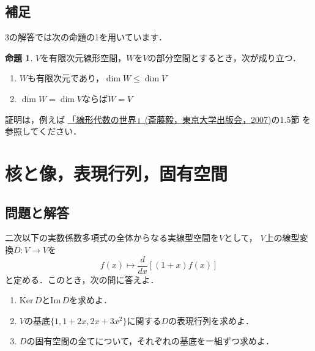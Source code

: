 \documentclass{jsarticle}
\theoremstyle{definition}
\newtheorem{prop}[defi]{命題}
\begin{document}
\subsection{補足}

3の解答では次の命題の1を用いています．

\begin{prop}\label{dim}
$V$を有限次元線形空間，$W$を$V$の部分空間とするとき，次が成り立つ．
\begin{enumerate}
\item $W$も有限次元であり，$\dim{W}\leq\dim{V}$
\item $\dim{W}=\dim{V}$ならば$W=V$
\end{enumerate}
\end{prop}

証明は，例えば
\href{http://www.utp.or.jp/book/b305671.html}{「線形代数の世界」(斎藤毅，東京大学出版会，2007)}の1.5節
を参照してください．

\section{核と像，表現行列，固有空間}
\subsection{問題と解答}

\begin{screen}
二次以下の実数係数多項式の全体からなる実線型空間を$V$として，
$V$上の線型変換$D\colon V\to V$を
\[ f(x)\mapsto\frac{d}{dx}[(1+x)f(x)] \]
と定める．このとき，次の問に答えよ．
\begin{enumerate}
\item$\mathrm{Ker}\,D$と$\mathrm{Im}\,D$を求めよ．
\item$V$の基底$\{1,1+2x,2x+3x^2\}$に関する$D$の表現行列を求めよ．
\item$D$の固有空間の全てについて，それぞれの基底を一組ずつ求めよ．
\end{enumerate}
\end{screen}
\end{document}
